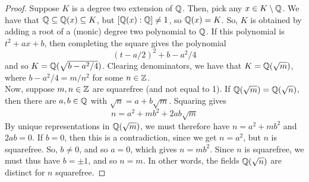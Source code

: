 \begin{proof}
    Suppose $K$ is a degree two extension of $\mathbb{Q}$. Then, pick any $x \in K \setminus \mathbb{Q}$. We have that $\mathbb{Q} \subseteq \mathbb{Q}(x) \subseteq K$, but $[\mathbb{Q}(x):\mathbb{Q}] \neq 1$, so $\mathbb{Q}(x) = K$. So, $K$ is obtained by adding a root of a (monic) degree two polynomial to $\mathbb{Q}$. If this polynomial is $t^2+ax+b$, then completing the square gives the polynomial
    \[ (t-a/2)^2 + b-a^2/4 \]
    and so $K = \mathbb{Q}(\sqrt{b-a^2/4})$. Clearing denominators, we have that $K = \mathbb{Q}(\sqrt{m})$, where $b-a^2/4 = m/n^2$ for some $n \in \mathbb{Z}$. \\

    Now, suppose $m,n \in \mathbb{Z}$ are squarefree (and not equal to 1). If $\mathbb{Q}(\sqrt{m}) = \mathbb{Q}(\sqrt{n})$, then there are $a,b \in \mathbb{Q}$ with $\sqrt{n} = a + b\sqrt{m}$. Squaring gives
    \[ n = a^2 + mb^2 + 2ab\sqrt{m} \]
    By unique representations in $\mathbb{Q}(\sqrt{m})$, we must therefore have $n = a^2+mb^2$ and $2ab = 0$. If $b = 0$, then this is a contradiction, since we get $n=a^2$, but $n$ is squarefree. So, $b \neq 0$, and so $a=0$, which gives $n = mb^2$. Since $n$ is squarefree, we must thus have $b = \pm 1$, and so $n = m$. In other words, the fields $\mathbb{Q}(\sqrt{n})$ are distinct for $n$ squarefree.
\end{proof}
